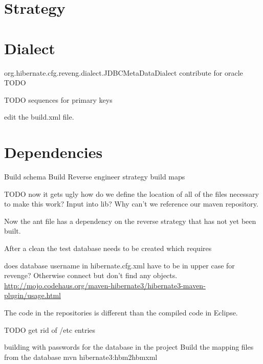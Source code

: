 \documentclass[a4paper,10pt]{book}
\begin{document}
\section{Strategy}



\section{Dialect} 
 org.hibernate.cfg.reveng.dialect.JDBCMetaDataDialect  contribute for oracle TODO

TODO sequences for primary keys

edit the build.xml file.

\section{Dependencies}
Build schema
Build Reverse engineer strategy
build maps

TODO now it gets ugly how do we define the location of all of the files necessary to make this work? Input into lib?  
Why can't we reference our maven repository.

Now the ant file has a dependency on the reverse strategy that has not yet been built.

After a clean the test database needs to be created which requires

does database username in hibernate.cfg.xml have to be in upper case for revenge?  Otherwise connect but don't find any objects.
\url{http://mojo.codehaus.org/maven-hibernate3/hibernate3-maven-plugin/usage.html}

The code in the repositories is different than the compiled code in Eclipse.

TODO get rid of /etc entries

building with passwords for the database in the project
Build the mapping files from the database
mvn hibernate3:hbm2hbmxml
\end{document}
